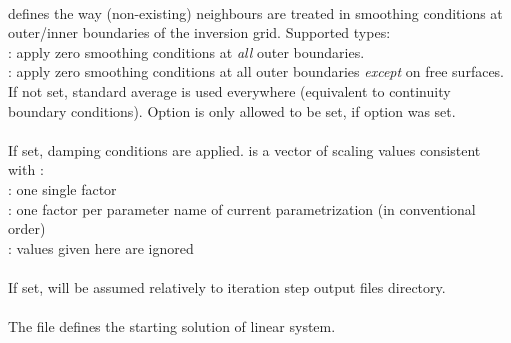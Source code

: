 \paragraph{}
 defines the way (non-existing) neighbours are treated in smoothing conditions at outer/inner 
boundaries of the inversion grid. Supported types:\\
: apply zero smoothing conditions at \emph{all} outer boundaries.\\
: apply zero smoothing conditions at all outer boundaries \emph{except} on free surfaces. \\
If not set, standard average is used everywhere (equivalent to continuity boundary conditions).
Option  is only allowed to be set, if option  was set.
\paragraph{}
If set, damping conditions are applied.  is a vector of scaling values consistent 
with :\\
: one single factor\\
: one factor per parameter name of current parametrization (in conventional order)\\
 : values given here are ignored
\paragraph{}
If set,  will be assumed relatively to iteration step output files directory.
\paragraph{}
The  file  defines the starting solution of linear system.
